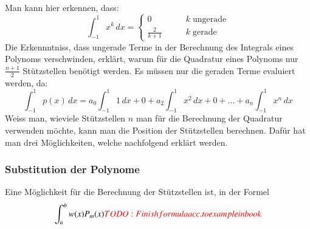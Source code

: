 Man kann hier erkennen, dass:
\begin{equation}
    \int_{-1}^{1} x^{k}\,dx 
    =
    \begin{cases}
        0&\qquad k \; \text{ungerade}\\
        \frac{2}{k+1}&\qquad k \; \text{gerade}
        \end{cases}  
\end{equation}
Die Erkennntniss, dass ungerade Terme in der Berechnung 
des Integrals eines Polynoms verschwinden, 
erklärt, warum für die Quadratur eines Polynoms nur $\frac{n+1}{2}$ 
Stützstellen benötigt werden. Es müssen nur die geraden Terme evaluiert werden,
da:
\begin{equation}
    \int_{-1}^{1} p(x)\,dx 
    =
    a_{0} \int_{-1}^{1} 1\,dx
    +
    0
    + 
    a_{2}\int_{-1}^{1} x^{2} \,dx  
    +
    0
    +
    ... 
    +
    a_{n}\int_{-1}^{1} x^{n}\,dx
\end{equation}
Weiss man, wieviele Stützstellen $n$ man für die Berechnung der Quadratur verwenden möchte,
kann man die Position der Stützstellen berechnen. 
Dafür hat man drei Möglichkeiten, welche nachfolgend erklärt werden.

\subsubsection{Substitution der Polynome}
Eine Möglichkeit für die Berechnung der Stützstellen ist, in der Formel
\begin{equation}
    \int_{a}^{b}w(x)P_{m}(x) \textcolor{red}{TODO: Finish formula acc. to example in book}
\end{equation}
